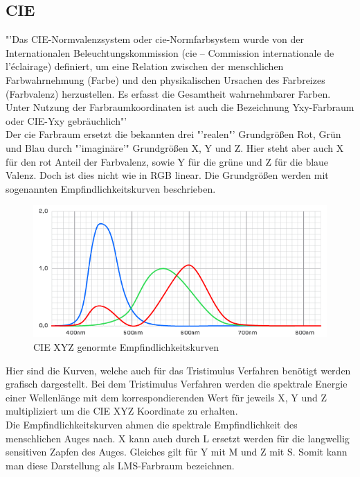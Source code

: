 \documentclass[11pt]{scrartcl}
\begin{document}
\subsection{CIE} \label{section_CIE}
"'Das CIE-Normvalenzsystem oder \ac{cie}-Normfarbsystem wurde von der Internationalen Beleuchtungskommission (\ac{cie} – Commission internationale de l’éclairage)
definiert, um eine Relation zwischen der menschlichen Farbwahrnehmung (Farbe) und den physikalischen Ursachen des Farbreizes (Farbvalenz) herzustellen.
Es erfasst die Gesamtheit wahrnehmbarer Farben. Unter Nutzung der Farbraumkoordinaten ist auch die Bezeichnung Yxy-Farbraum oder CIE-Yxy gebräuchlich"'
\cite{wikipediaCIE}\\
Der \ac{cie} Farbraum ersetzt die bekannten drei "'realen"' Grundgrößen Rot, Grün und Blau durch "'imaginäre'" Grundgrößen X, Y und Z. Hier steht aber auch
X für den rot Anteil der Farbvalenz, sowie Y für die grüne und Z für die blaue Valenz. Doch ist dies nicht wie in RGB linear. Die Grundgrößen werden mit
sogenannten Empfindlichkeitskurven beschrieben.
\begin{figure}[H]
    \begin{center}
        \includegraphics[width=.5\textwidth]{images/cie_tristimul.png}
    \end{center}
    \caption{CIE XYZ genormte Empfindlichkeitskurven \cite{wikipediaCIE}}
\end{figure}
\noindent
Hier sind die Kurven, welche auch für das Tristimulus Verfahren benötigt werden grafisch dargestellt. Bei dem Tristimulus Verfahren werden die spektrale Energie
einer Wellenlänge mit dem korrespondierenden Wert für jeweils X, Y und Z multipliziert um die CIE XYZ Koordinate zu erhalten.\\
Die Empfindlichkeitskurven ahmen die spektrale Empfindlichkeit des menschlichen Auges nach. X kann auch durch L ersetzt werden für die langwellig sensitiven Zapfen
des Auges. Gleiches gilt für Y mit M und Z mit S. Somit kann man diese Darstellung als LMS-Farbraum bezeichnen.\\
\end{document}
